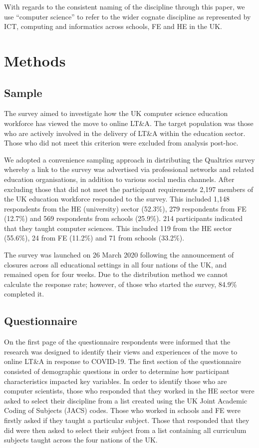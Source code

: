 \documentclass[sigconf]{acmart}
\begin{document}
With regards to the consistent naming of the discipline through this
paper, we use ``computer science'' to refer to the wider cognate
discipline as represented by ICT, computing and informatics across
schools, FE and HE in the UK.

\section{Methods}\label{methods}

\subsection{Sample}

The survey aimed to investigate how the UK computer science education
workforce has viewed the move to online LT\&A. The target population was
those who are actively involved in the delivery of LT\&A within the
education sector. Those who did not meet this criterion were excluded
from analysis post-hoc.

We adopted a convenience sampling approach in distributing the
Qualtrics survey whereby a link to the survey was advertised via
professional networks and related education organisations, in addition
to various social media channels. After excluding those that did not
meet the participant requirements 2,197 members of the UK education
workforce responded to the survey. This included 1,148 respondents
from the HE (university) sector (52.3\%), 279 respondents from FE
(12.7\%) and 569 respondents from schools (25.9\%). 214 participants
indicated that they taught computer sciences. This included 119 from
the HE sector (55.6\%), 24 from FE (11.2\%) and 71 from schools
(33.2\%).

The survey was launched on 26 March 2020 following the announcement of
closures across all educational settings in all four nations of the
UK, and remained open for four weeks. Due to the distribution method
we cannot calculate the response rate; however, of those who started
the survey, 84.9\% completed it.

\subsection{Questionnaire}

On the first page of the questionnaire respondents were informed that
the research was designed to identify their views and experiences of
the move to online LT\&A in response to COVID-19. The first section of
the questionnaire consisted of demographic questions in order to
determine how participant characteristics impacted key variables. In
order to identify those who are computer scientists, those who
responded that they worked in the HE sector were asked to select their
discipline from a list created using the UK Joint Academic Coding of
Subjects (JACS) codes. Those who worked in schools and FE were firstly
asked if they taught a particular subject. Those that responded that
they did were then asked to select their subject from a list
containing all curriculum subjects taught across the four nations of
the UK.
\end{document}
